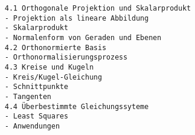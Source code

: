 \begin{verbatim}
4.1 Orthogonale Projektion und Skalarprodukt
- Projektion als lineare Abbildung
- Skalarprodukt
- Normalenform von Geraden und Ebenen
4.2 Orthonormierte Basis
- Orthonormalisierungsprozess
4.3 Kreise und Kugeln
- Kreis/Kugel-Gleichung
- Schnittpunkte
- Tangenten
4.4 Überbestimmte Gleichungssyteme
- Least Squares
- Anwendungen
\end{verbatim}

